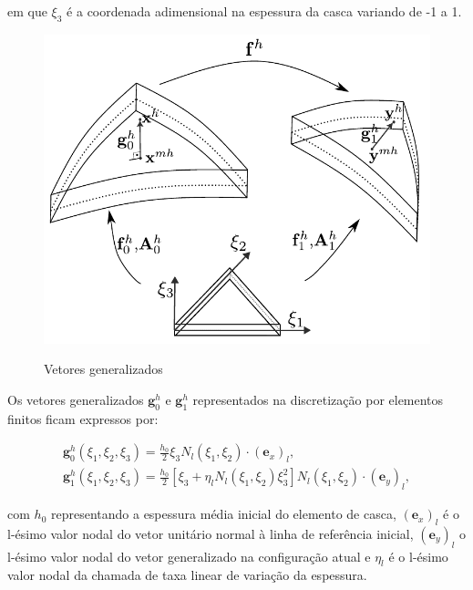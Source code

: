\noindent em que $\xi_3$ é a coordenada adimensional na espessura da casca variando de -1 a 1.

\begin{figure}[!htbp]
	\caption{Vetores generalizados}
	\centering
	\includegraphics[scale=0.8,trim=0cm 0.0cm 0cm 0cm, clip=true]{Imagens/Cap4/casca_vetores_generalizados.pdf}	
	\label{fig:casca_vetores_generalizados}
\end{figure}

Os vetores generalizados $\mathbf{g}^{h}_{0}$ e $\mathbf{g}^{h}_{1}$ representados na discretização por elementos finitos ficam expressos por:

\begin{align}
\mathbf{g}^{h}_{0} (\xi_{1},\xi_{2}, \xi_{3}) = \frac{h_{0}}{2}\xi_{3} N_{l}\left(\xi_{1},\xi_{2}\right) \cdot  (\mathbf{e}_x)_l, \\
\mathbf{g}^{h}_{1} (\xi_{1},\xi_{2}, \xi_{3}) = \frac{h_{0}}{2}\left[\xi_{3} + \eta_l N_l\left(\xi_{1},\xi_{2}\right)\xi_{3}^2\right]N_{l}\left(\xi_{1},\xi_{2}\right) \cdot (\mathbf{e}_y)_l,
\end{align}

\noindent com $h_{0}$ representando a espessura média inicial do elemento de casca, $(\mathbf{e}_x)_l$ é o l-ésimo valor nodal do vetor unitário normal à linha de referência inicial, $(\mathbf{e}_y)_l$ o l-ésimo valor nodal do vetor generalizado na configuração atual e $\eta_l$ é o l-ésimo valor nodal da chamada de taxa linear de variação da espessura.

